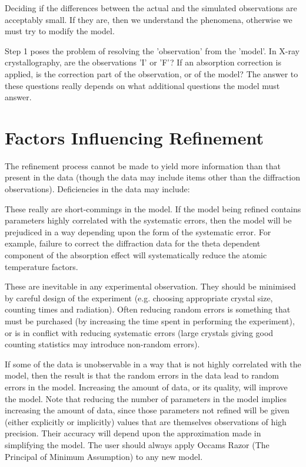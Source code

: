 \documentclass[10pt,a4paper]{report}
\begin{document}
Deciding if the differences between the actual and the simulated 
 observations are acceptably small. If they are, then we understand
 the phenomena, otherwise we must try to modify the model.





Step 1 poses the problem of resolving the 'observation' from the 'model'.
 In X-ray crystallography, are the observations 'I' or 'F'? If an absorption
 correction is applied, is the correction part of the observation, or of the
 model? The answer to these questions really depends on what additional
 questions the model must answer.



\section{Factors Influencing Refinement}


The refinement process cannot be made to yield more information than
 that present in the data (though the data may include items other than
 the diffraction observations). Deficiencies in the data may include:


\bigskip{}




These really are short-commings in the model. If the model being refined
 contains parameters highly correlated with the systematic errors, then the
 model will be prejudiced in a way depending upon the form of the systematic
 error. For example, failure to correct the diffraction data for the theta
 dependent component of the absorption effect will systematically reduce
 the atomic temperature factors.


\bigskip{}




These are inevitable in any experimental observation. They should be
 minimised by careful design of the experiment (e.g. choosing appropriate
 crystal size,  counting times and radiation). Often reducing random errors
 is something that must be purchased (by increasing the time spent in
 performing the experiment), or is in conflict with reducing systematic errors
 (large crystals giving good counting statistics may introduce non-random
 errors).


\bigskip{}




If some of the data is unobservable in a way that is not
 highly correlated with 
 the model, then the result is that the random errors in the data lead to
 random errors in the model. Increasing the amount of data, or its quality,
 will improve the model. Note that reducing the number of parameters in 
 the model implies increasing the amount of data, since those parameters
 not refined will be given (either explicitly or implicitly) values that
 are themselves observations of high precision. Their accuracy will depend
 upon the approximation made in simplifying the model. The user should
 always apply Occams Razor (The Principal of Minimum Assumption) to any
 new model.
\end{document}
